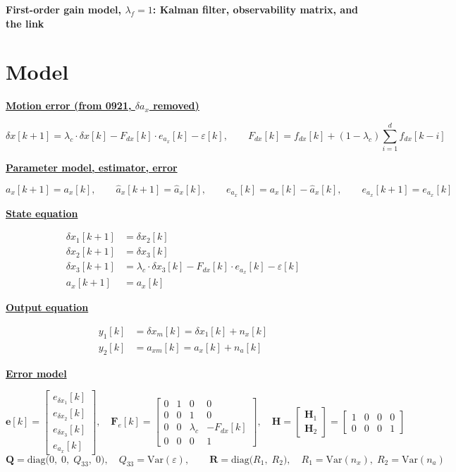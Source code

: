 \documentclass[11pt,a4paper]{ctexart}
\newcommand{\lc}{\lambda_c}
\newcommand{\hd}[1]{\par\medskip\noindent\underline{\textbf{#1}}\par\nobreak\vspace{0.2ex}}
\begin{document}
\begin{center}\textbf{\large First-order gain model, $\lambda_f = 1$: Kalman filter, observability matrix, and the link}\end{center}

\section{Model}

\hd{Motion error (from 0921, $\delta a_x$ removed)}
\[
\delta x[k+1] = \lc \cdot \delta x[k] - F_{dx}[k]\cdot e_{a_x}[k] - \varepsilon[k], \qquad
F_{dx}[k] = f_{dx}[k] + (1-\lc)\textstyle\sum_{i=1}^{d} f_{dx}[k-i]
\]

\hd{Parameter model, estimator, error}
\[
a_x[k+1] = a_x[k], \qquad \hat a_x[k+1] = \hat a_x[k], \qquad e_{a_x}[k] = a_x[k] - \hat a_x[k], \qquad e_{a_x}[k+1] = e_{a_x}[k]
\]

\hd{State equation}
\[
\begin{aligned}
\delta x_1[k+1] &= \delta x_2[k] \\
\delta x_2[k+1] &= \delta x_3[k] \\
\delta x_3[k+1] &= \lc \cdot \delta x_3[k] - F_{dx}[k]\cdot e_{a_x}[k] - \varepsilon[k] \\
a_x[k+1] &= a_x[k]
\end{aligned}
\]

\hd{Output equation}
\[
\begin{aligned}
y_1[k] &= \delta x_m[k] = \delta x_1[k] + n_x[k] \\
y_2[k] &= a_{xm}[k] = a_x[k] + n_a[k]
\end{aligned}
\]

\hd{Error model}
\[
\mathbf{e}[k] = \begin{bmatrix} e_{\delta x_1}[k] \\ e_{\delta x_2}[k] \\ e_{\delta x_3}[k] \\ e_{a_x}[k] \end{bmatrix}, \quad
\mathbf{F}_e[k] =
\begin{bmatrix}
0 & 1 & 0 & 0 \\
0 & 0 & 1 & 0 \\
0 & 0 & \lc & -F_{dx}[k] \\
0 & 0 & 0 & 1
\end{bmatrix}, \quad
\mathbf{H} =
\begin{bmatrix} \mathbf{H}_1 \\ \mathbf{H}_2 \end{bmatrix} =
\begin{bmatrix}
1 & 0 & 0 & 0 \\
0 & 0 & 0 & 1
\end{bmatrix}
\]
\[
\mathbf{Q} = \mathrm{diag}\big(0,\;0,\;Q_{33},\;0\big), \quad Q_{33} = \mathrm{Var}(\varepsilon), \qquad
\mathbf{R} = \mathrm{diag}\big(R_1,\;R_2\big), \quad R_1 = \mathrm{Var}(n_x),\; R_2 = \mathrm{Var}(n_a)
\]
\end{document}
